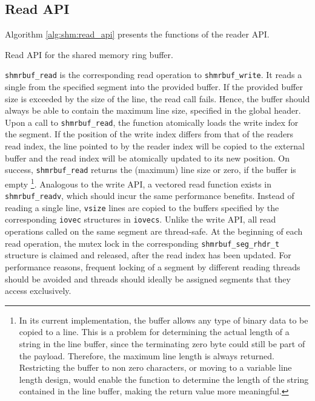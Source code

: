 \subsection{Read API}

Algorithm \ref{alg:shm:read_api} presents the functions of the reader API.
\begin{algorithm}[h!]
    
    \caption[Shared Memory Ringbuffer: Read API]{Read API for the shared memory ring buffer.}
    \label{alg:shm:read_api}
\end{algorithm}

\texttt{shmrbuf\_read} is the corresponding read operation to \texttt{shmrbuf\_write}. It reads a single from
the specified segment into the provided buffer. If the provided buffer size is exceeded by the
size of the line, the read call fails. Hence, the buffer should always be able to contain the maximum line size, specified 
in the global header. Upon a call to \texttt{shmrbuf\_read}, the function atomically loads the write index for the segment. 
If the position of the write index differs from that of the readers read index, the line pointed to by 
the reader index will be copied to the external buffer and the read index will be atomically updated to its new position.
On success, \texttt{shmrbuf\_read} returns the (maximum) line size or zero, if the buffer is empty \footnote{In its current implementation, the buffer allows any type of binary data to be copied to a line. This is a problem for determining the actual length of a string
in the line buffer, since the terminating zero byte could still be part of the payload. Therefore, the maximum line length is always returned. Restricting the buffer to
non zero characters, or moving to a variable line length design, would enable the function to determine the length of the string contained in the line buffer, making the return value more meaningful.}.     
Analogous to the write API, a vectored read function exists in \texttt{shmrbuf\_readv}, which should incur the same performance benefits.
Instead of reading a single line, \texttt{vsize} lines are copied to the buffers specified by the corresponding \texttt{iovec} structures in \texttt{iovecs}.
Unlike the write API, all read operations called on the same segment are thread-safe. 
At the beginning of each read operation, the mutex lock in the corresponding \texttt{shmrbuf\_seg\_rhdr\_t} structure is claimed and released, after the read index has been updated.
For performance reasons, frequent locking of a segment by different reading threads should be avoided and threads should ideally be assigned segments that they access exclusively.
